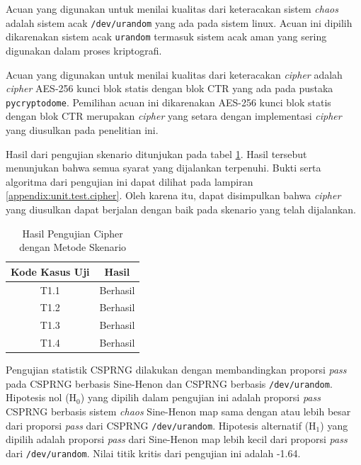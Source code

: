 Acuan yang digunakan untuk menilai kualitas dari keteracakan sistem \emph{chaos} adalah sistem acak \texttt{/dev/urandom} yang ada pada sistem linux. Acuan ini dipilih dikarenakan sistem acak \texttt{urandom} termasuk sistem acak aman yang sering digunakan dalam proses kriptografi. 

Acuan yang digunakan untuk menilai kualitas dari keteracakan \emph{cipher} adalah \emph{cipher} AES-256 kunci blok statis dengan blok CTR yang ada pada pustaka \texttt{pycryptodome}. Pemilihan acuan ini dikarenakan AES-256 kunci blok statis dengan blok CTR merupakan \emph{cipher} yang setara dengan implementasi \emph{cipher} yang diusulkan pada penelitian ini.

Hasil dari pengujian skenario ditunjukan pada tabel \ref{tab:test.result.cipher}. Hasil tersebut menunjukan bahwa semua syarat yang dijalankan terpenuhi. Bukti serta algoritma dari pengujian ini dapat dilihat pada lampiran \ref{appendix:unit.test.cipher}. Oleh karena itu, dapat disimpulkan bahwa \emph{cipher} yang diusulkan dapat berjalan dengan baik pada skenario yang telah dijalankan.

\begin{table}[!h]
  \centering
  \caption{Hasil Pengujian Cipher dengan Metode Skenario} \label{tab:test.result.cipher}
  \begin{tabular}{|c|c|}
    \hline
    \textbf{Kode Kasus Uji} & \textbf{Hasil} \\ \hline
    T1.1 & Berhasil \\ \hline
    T1.2 & Berhasil \\ \hline
    T1.3 & Berhasil \\ \hline
    T1.4 & Berhasil \\ \hline
  \end{tabular}
\end{table}

Pengujian statistik CSPRNG dilakukan dengan membandingkan proporsi \emph{pass} pada CSPRNG berbasis Sine-Henon dan CSPRNG berbasis \texttt{/dev/urandom}. Hipotesis nol ($\text{H}_0$) yang dipilih dalam pengujian ini adalah proporsi \emph{pass} CSPRNG berbasis sistem \emph{chaos} Sine-Henon map sama dengan atau lebih besar dari proporsi \emph{pass} dari CSPRNG \texttt{/dev/urandom}. Hipotesis alternatif ($\text{H}_1$) yang dipilih adalah proporsi \emph{pass} dari Sine-Henon map lebih kecil dari proporsi \emph{pass} dari \texttt{/dev/urandom}. Nilai titik kritis dari pengujian ini adalah -1.64.

